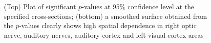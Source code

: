 \begin{figure}
\caption{(Top) Plot of significant $p$-values at 95\% confidence level at the specified cross-sections; (bottom) a smoothed surface obtained from the $p$-values clearly shows high spatial dependence in right optic nerve, auditory nerves, auditory cortex and left visual cortex areas}
\label{fig:fmrifigure}
\end{figure}
